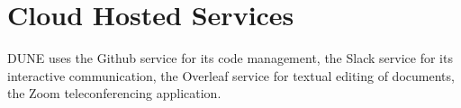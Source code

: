 \documentclass[../main-v1.tex]{subfiles}
\begin{document}
\section{Cloud Hosted Services}
DUNE uses the Github service for its code management, the Slack service for its interactive communication, the Overleaf service for textual editing of documents, the Zoom teleconferencing application.
\end{document}
